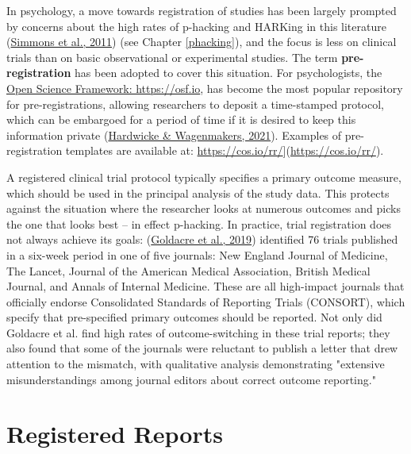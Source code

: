 \documentclass{krantz}
\begin{document}
In psychology, a move towards registration of studies has been largely prompted by concerns about the high rates of p-hacking and HARKing in this literature (\protect\hyperlink{ref-simmons2011}{Simmons et al., 2011}) (see Chapter \ref{phacking}), and the focus is less on clinical trials than on basic observational or experimental studies. The term \textbf{pre-registration} has been adopted to cover this situation. For psychologists, the \href{https://osf.io}{Open Science Framework: https://osf.io}, has become the most popular repository for pre-registrations, allowing researchers to deposit a time-stamped protocol, which can be embargoed for a period of time if it is desired to keep this information private (\protect\hyperlink{ref-hardwicke2021}{Hardwicke \& Wagenmakers, 2021}). Examples of pre-registration templates are available at: \url{https://cos.io/rr/}{]}(\url{https://cos.io/rr/}).

\begin{tcolorbox}[colback=Black!5!lightgray,colframe=black!75!black,coltitle=white,title=Does trial registration prevent outcome-switching?]\label{box:switch}
A registered clinical trial protocol typically specifies a primary outcome measure, which should be used in the principal analysis of the study data. This protects against the situation where the researcher looks at numerous outcomes and picks the one that looks best -- in effect p-hacking. In practice, trial registration does not always achieve its goals: (\protect\hyperlink{ref-goldacre2019}{Goldacre et al., 2019}) identified 76 trials published in a six-week period in one of five journals: New England Journal of Medicine, The Lancet, Journal of the American Medical Association, British Medical Journal, and Annals of Internal Medicine. These are all high-impact journals that officially endorse Consolidated Standards of Reporting Trials (CONSORT), which specify that pre-specified primary outcomes should be reported. Not only did Goldacre et al. find high rates of outcome-switching in these trial reports; they also found that some of the journals were reluctant to publish a letter that drew attention to the mismatch, with qualitative analysis demonstrating "extensive misunderstandings among journal editors about correct outcome reporting."
\end{tcolorbox}


\hypertarget{registered-reports}{%
\section{Registered Reports}\label{registered-reports}}
\end{document}
